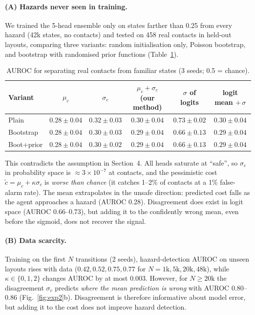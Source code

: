 \paragraph{(A) Hazards never seen in training.} We trained the 5-head ensemble only on states farther
than 0.25 from every hazard (42k states, no contacts) and tested on 458 real contacts in held-out
layouts, comparing three variants: random initialisation only, Poisson bootstrap, and bootstrap with
randomised prior functions (Table~\ref{tab:exp2a}).

\begin{table}[h]
\centering
\caption{AUROC for separating real contacts from familiar states (3 seeds; 0.5 = chance).}
\label{tab:exp2a}
\begin{tabular}{lccccc}
\toprule
Variant & $\mu_c$ & $\sigma_c$ & $\mu_c+\sigma_c$ (our method) & $\sigma$ of logits & logit mean $+\,\sigma$ \\
\midrule
Plain      & $0.28\pm0.04$ & $0.32\pm0.03$ & $0.30\pm0.04$ & $0.73\pm0.02$ & $0.30\pm0.04$ \\
Bootstrap  & $0.28\pm0.04$ & $0.30\pm0.03$ & $0.29\pm0.04$ & $0.66\pm0.13$ & $0.29\pm0.04$ \\
Boot+prior & $0.28\pm0.04$ & $0.30\pm0.02$ & $0.29\pm0.04$ & $0.66\pm0.13$ & $0.29\pm0.04$ \\
\bottomrule
\end{tabular}
\end{table}

This contradicts the assumption in Section~4. All heads saturate at ``safe'', so $\sigma_c$ in
probability space is $\approx 3\times10^{-7}$ at contacts, and the pessimistic cost
$\tilde c=\mu_c+\kappa\sigma_c$ is \emph{worse than chance} (it catches 1--2\% of contacts at a 1\%
false-alarm rate). The mean extrapolates in the unsafe direction: predicted cost falls as the agent
approaches a hazard (AUROC 0.28). Disagreement does exist in logit space (AUROC 0.66--0.73), but adding
it to the confidently wrong mean, even before the sigmoid, does not recover the signal.

\paragraph{(B) Data scarcity.} Training on the first $N$ transitions (2 seeds), hazard-detection AUROC
on unseen layouts rises with data ($0.42, 0.52, 0.75, 0.77$ for $N = 1\text{k}, 5\text{k}, 20\text{k}, 48\text{k}$),
while $\kappa \in \{0, 1, 2\}$ changes AUROC by at most $0.003$. However, for $N \geq 20\text{k}$ the
disagreement $\sigma_c$ predicts \emph{where the mean prediction is wrong} with AUROC 0.80--0.86
(Fig.~\ref{fig:exp2}b). Disagreement is therefore informative about model error, but adding it to the
cost does not improve hazard detection.

